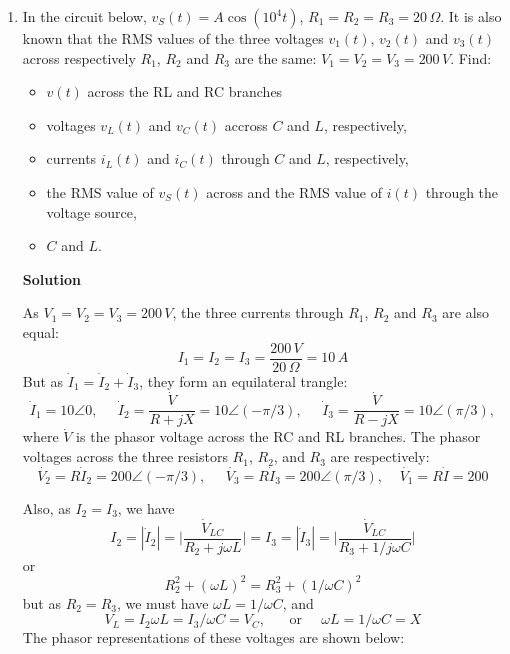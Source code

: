 \begin{enumerate}
\item In the circuit below, $v_S(t)=A\cos(10^4 t)$, $R_1=R_2=R_3=20\,\Omega$.
  It is also known that the RMS values of the three voltages $v_1(t),\,v_2(t)$ 
  and $v_3(t)$ across respectively $R_1$, $R_2$ and $R_3$ are the same: 
  $V_1=V_2=V_3=200\,V$. Find:
  \begin{itemize}
    \item $v(t)$ across the RL and RC branches
    \item voltages $v_L(t)$ and $v_C(t)$ accross $C$ and $L$, respectively,
    \item currents $i_L(t)$ and $i_C(t)$ through $C$ and $L$, respectively,
    \item the RMS value of $v_S(t)$ across and the RMS value of $i(t)$ through 
      the voltage source,
    \item $C$ and $L$.
  \end{itemize}

    
  {\bf Solution} 
  
  As $V_1=V_2=V_3=200\,V$, the three currents through $R_1$, $R_2$ and 
  $R_3$ are also equal:
  \[
  I_1=I_2=I_3=\frac{200\,V}{20\,\Omega}=10\,A
  \]
  But as $\dot{I}_1=\dot{I}_2+\dot{I}_3$, they form an equilateral trangle:
  \[
  \dot{I}_1=10\angle 0,\;\;\;\;\;
  \dot{I}_2=\frac{\dot{V}}{R+jX}=10\angle (-\pi/3),\;\;\;\;\; 
  \dot{I}_3=\frac{\dot{V}}{R-jX}=10\angle (\pi/3),
  \]
  where $\dot{V}$ is the phasor voltage across the RC and RL branches.
  The phasor voltages across the three resistors $R_1$, $R_2$, and $R_3$
  are respectively:
  \[
  \dot{V_2}=R\dot{I}_2=200\angle (-\pi/3),\;\;\;\;\; 
  \dot{V_3}=R\dot{I}_3=200\angle (\pi/3),\;\;\;\;
  \dot{V_1}=R\dot{I}=200
  \]

  Also, as $I_2=I_3$, we have
  \[
  I_2=|\dot{I}_2|=\bigg|\frac{\dot{V}_{LC}}{R_2+j\omega L}\bigg|
  =I_3=|\dot{I}_3|=\bigg|\frac{\dot{V}_{LC}}{R_3+1/j\omega C}\bigg|
  \]
  or
  \[
  R_2^2+(\omega L)^2=R_3^2+(1/\omega C)^2
  \]
  but as $R_2=R_3$, we must have $\omega L=1/\omega C$, and
  \[
  V_L=I_2\omega L=I_3/\omega C=V_C,\;\;\;\;\;\;\mbox{or}\;\;\;\;\;
  \omega L=1/\omega C=X
  \]
  The phasor representations of these voltages are shown below:  



\end{enumerate}

